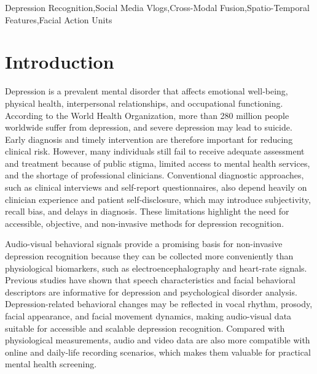 \documentclass[a4paper,fleqn]{cas-dc}
\begin{document}
\begin{keywords}
Depression Recognition\sep Social Media Vlogs\sep Cross-Modal Fusion\sep  Spatio-Temporal Features\sep Facial Action Units
\end{keywords}

\maketitle

\section{Introduction}
Depression is a prevalent mental disorder that affects emotional well-being, physical health, interpersonal relationships, and occupational functioning. According to the World Health Organization\cite{WHO}, more than 280 million people worldwide suffer from depression, and severe depression may lead to suicide. Early diagnosis and timely intervention are therefore important for reducing clinical risk. However, many individuals still fail to receive adequate assessment and treatment because of public stigma, limited access to mental health services, and the shortage of professional clinicians\cite{causes}. Conventional diagnostic approaches, such as clinical interviews and self-report questionnaires, also depend heavily on clinician experience and patient self-disclosure, which may introduce subjectivity, recall bias, and delays in diagnosis. These limitations highlight the need for accessible, objective, and non-invasive methods for depression recognition.

Audio-visual behavioral signals provide a promising basis for non-invasive depression recognition because they can be collected more conveniently than physiological biomarkers, such as electroencephalography and heart-rate signals\cite{EEG,heart_rate_1,heart_rate_2}.
Previous studies have shown that speech characteristics and facial behavioral descriptors are informative for depression and psychological disorder analysis\cite{auditory:signal,visual:signal}. Depression-related behavioral changes may be reflected in vocal rhythm, prosody, facial appearance, and facial movement dynamics, making audio-visual data suitable for accessible and scalable depression recognition. Compared with physiological measurements, audio and video data are also more compatible with online and daily-life recording scenarios, which makes them valuable for practical mental health screening.
\end{document}

